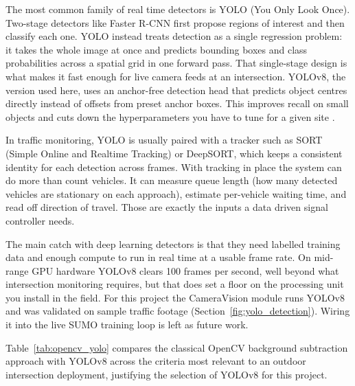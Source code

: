 ﻿\documentclass[11pt, a4paper]{report}
\begin{document}
The most common family of real time detectors is YOLO (You Only Look Once). Two-stage detectors like Faster R-CNN first propose regions of interest and then classify each one. YOLO instead treats detection as a single regression problem: it takes the whole image at once and predicts bounding boxes and class probabilities across a spatial grid in one forward pass. That single-stage design is what makes it fast enough for live camera feeds at an intersection. YOLOv8, the version used here, uses an anchor-free detection head that predicts object centres directly instead of offsets from preset anchor boxes. This improves recall on small objects and cuts down the hyperparameters you have to tune for a given site \cite{futuretransp5040137}.

In traffic monitoring, YOLO is usually paired with a tracker such as SORT (Simple Online and Realtime Tracking) or DeepSORT, which keeps a consistent identity for each detection across frames. With tracking in place the system can do more than count vehicles. It can measure queue length (how many detected vehicles are stationary on each approach), estimate per-vehicle waiting time, and read off direction of travel. Those are exactly the inputs a data driven signal controller needs.

The main catch with deep learning detectors is that they need labelled training data and enough compute to run in real time at a usable frame rate. On mid-range GPU hardware YOLOv8 clears 100 frames per second, well beyond what intersection monitoring requires, but that does set a floor on the processing unit you install in the field. For this project the CameraVision module runs YOLOv8 and was validated on sample traffic footage (Section~\ref{fig:yolo_detection}). Wiring it into the live SUMO training loop is left as future work.

Table~\ref{tab:opencv_yolo} compares the classical OpenCV background subtraction approach with YOLOv8 across the criteria most relevant to an outdoor intersection deployment, justifying the selection of YOLOv8 for this project.
\end{document}
